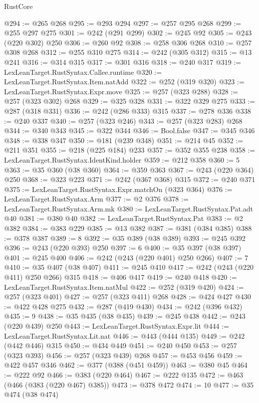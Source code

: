 \begin{lexlean}{RustCore}
\begin{coremodule}
@294 := @265 @268
@295 := @293 @294
@297 := @257 @295 @268
@299 := @255 @297 @275
@301 := @242 (@291 @299)
@302 := @245 @92
@305 := @243 (@220 @302) @250
@306 := @260 @92
@308 := @258 @306 @268
@310 := @257 @308 @268
@312 := @255 @310 @275
@314 := @242 (@305 @312)
@315 := @13 @241
@316 := @314 @315
@317 := @301 @316
@318 := @240 @317
@319 := LexLeanTarget.RustSyntax.Callee.runtime
@320 := LexLeanTarget.RustSyntax.Item.natAdd
@322 := @252 (@319 @320)
@323 := LexLeanTarget.RustSyntax.Expr.move
@325 := @257 (@323 @288)
@328 := @257 (@323 @302) @268
@329 := @325 @328
@331 := @322 @329 @275
@333 := @287 (@318 @331)
@336 := @242 (@286 @333) @315
@337 := @278 @336
@338 := @240 @337
@340 := @257 (@323 @246)
@343 := @257 (@323 @283) @268
@344 := @340 @343
@345 := @322 @344
@346 := Bool.false
@347 := @345 @346
@348 := @338 @347
@350 := @181 (@239 @348)
@351 := @214 @45
@352 := @211 @351
@355 := @218 (@225 @184) @233
@357 := @352 @355 @238
@358 := LexLeanTarget.RustSyntax.IdentKind.holder
@359 := @212 @358
@360 := 5
@363 := @35 @360 (@38 @360)
@364 := @359 @363
@367 := @243 (@220 @364) @250
@368 := @323 @223
@371 := @242 (@367 @368) @315
@372 := @240 @371
@375 := LexLeanTarget.RustSyntax.Expr.matchOn (@323 @364)
@376 := LexLeanTarget.RustSyntax.Arm
@377 := @2 @376
@378 := LexLeanTarget.RustSyntax.Arm.mk
@380 := LexLeanTarget.RustSyntax.Pat.adt @40
@381 := @380 @40
@382 := LexLeanTarget.RustSyntax.Pat
@383 := @2 @382
@384 := @383 @229
@385 := @13 @382
@387 := @381 (@384 @385)
@388 := @378 @387
@389 := 8
@392 := @35 @389 (@38 @389)
@393 := @245 @392
@396 := @243 (@220 @393) @250
@397 := 6
@400 := @35 @397 (@38 @397)
@401 := @245 @400
@406 := @242 (@243 (@220 @401) @250 @266)
@407 := 7
@410 := @35 @407 (@38 @407)
@411 := @245 @410
@417 := @242 (@243 (@220 @411) @250 @266) @315
@418 := @406 @417
@419 := @240 @418
@420 := LexLeanTarget.RustSyntax.Item.natMul
@422 := @252 (@319 @420)
@424 := @257 (@323 @401)
@427 := @257 (@323 @411) @268
@428 := @424 @427
@430 := @422 @428 @275
@432 := @287 (@419 @430)
@434 := @242 (@396 @432)
@435 := 9
@438 := @35 @435 (@38 @435)
@439 := @245 @438
@442 := @243 (@220 @439) @250
@443 := LexLeanTarget.RustSyntax.Expr.lit
@444 := LexLeanTarget.RustSyntax.Lit.nat
@446 := @443 (@444 @135)
@449 := @242 (@442 @446) @315
@450 := @434 @449
@451 := @240 @450
@453 := @257 (@323 @393)
@456 := @257 (@323 @439) @268
@457 := @453 @456
@459 := @422 @457 @346
@462 := @377 (@388 (@451 @459))
@463 := @380 @45
@464 := @222 @92
@466 := @383 (@220 @464)
@467 := @222 @135
@472 := @463 (@466 (@383 (@220 @467) @385))
@473 := @378 @472
@474 := 10
@477 := @35 @474 (@38 @474)

\end{coremodule}
\end{lexlean}
